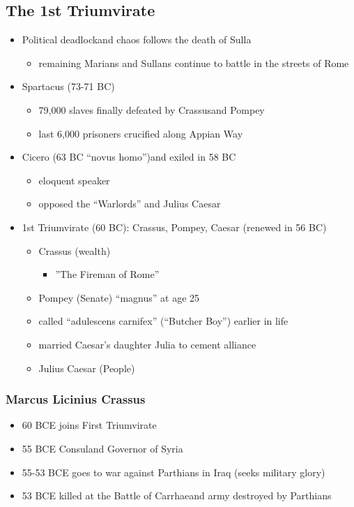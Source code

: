 \documentclass[12pt, twoside]{article}
\begin{document}
\subsection{The 1st Triumvirate}
\begin{itemize}
\item Political deadlockand chaos follows the death of Sulla
	\begin{itemize}
	\item remaining Marians and Sullans continue to battle in the streets of Rome
	\end{itemize}
\item Spartacus (73-71 BC)
	\begin{itemize}
	\item 79,000 slaves finally defeated by Crassusand Pompey
	\item last 6,000 prisoners crucified along Appian Way
	\end{itemize}
\item Cicero (63 BC “novus homo”)and exiled in 58 BC
	\begin{itemize}
	\item eloquent speaker
	\item opposed the “Warlords” and Julius Caesar
	\end{itemize}
\item 1st Triumvirate (60 BC): Crassus, Pompey, Caesar (renewed in 56 BC)
	\begin{itemize}
	\item Crassus (wealth)
		\begin{itemize}
		\item ”The Fireman of Rome”	
		\end{itemize}
	\item Pompey (Senate) “magnus” at age 25
	\item called “adulescens carnifex” (“Butcher Boy”) earlier in life
	\item married Caesar’s daughter Julia to cement alliance
	\item Julius Caesar (People)
	\end{itemize}
\end{itemize}

\subsubsection{Marcus Licinius Crassus}
\begin{itemize}
\item 60 BCE joins First Triumvirate 
\item 55 BCE Consuland Governor of Syria
\item 55-53 BCE goes to war against Parthians in Iraq (seeks military glory)
\item 53 BCE killed at the Battle of Carrhaeand army destroyed by Parthians
\end{itemize}
	
\end{document}
